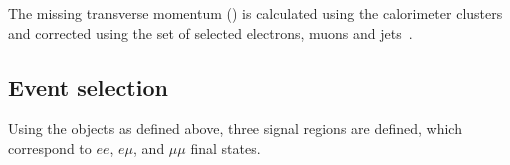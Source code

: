 
The missing transverse momentum (\met{}) is calculated using the calorimeter clusters and corrected using the set of selected electrons, muons and jets~\cite{Aad:2012re}.



\subsection{Event selection}\label{sect:selection}

Using the objects as defined above, three signal regions are defined, which correspond to $ee$, $e \mu$, and $\mu \mu$ final states.


